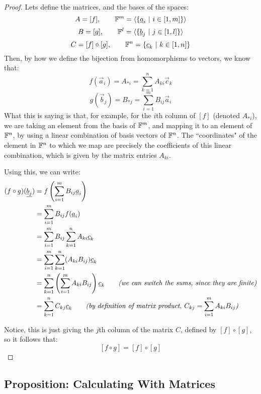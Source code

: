 \documentclass{exam}
\begin{document}
\begin{proof}

Lets define the matrices, and the bases of the spaces:
\[
A = [f], \qquad \F^m = \langle \{\vec{a}_i \ | \ i \in [1,m]\}\rangle
\]
\[
B = [g], \qquad \F^l = \langle \{\vec{b}_j \ | \ j \in [1,l]\}\rangle
\]
\[
C = [f]\circ[g], \qquad \F^n = \{\vec{c}_k \ | \ k \in [1,n]\}
\]
Then, by how we define the bijection from homomorphisms to vectors, we know that:
\[
f(\vec{a}_i) = A_{*i} = \sum_{k = 1}^n A_{ki}\vec{c}_k  
\]
\[
g(\vec{b}_j) = B_{*j} = \sum_{i = 1}^m B_{ij}\vec{a}_i  
\]
What this is saying is that, for example, for the $i$th column of $[f]$ (denoted $A_{*i}$), we are taking an element from the basis of $\F^m$, and mapping it to an element of $\F^n$, by using a linear combination of basis vectors of $\F^n$. The ``coordinates" of the element in $\F^n$ to which we map are precisely the coefficients of this linear combination, which is given by the matrix entries $A_{ki}$. 

\bigskip

Using this, we can write:
\begin{align*}
    (f \circ g)(\vec{\vec{b}_j}) &= f\left(\sum_{i = 1}^m B_{ij}\vec{a}_i  \right) \\
    &= \sum_{i = 1}^m B_{ij}f(\vec{a}_i) \\
    &= \sum_{i = 1}^m B_{ij}\sum_{k = 1}^n A_{ki}\vec{c}_k   \\
    &= \sum_{i = 1}^m \sum_{k = 1}^n (A_{ki}B_{ij})\vec{c}_k   \\
    &=  \sum_{k = 1}^n \left(\sum_{i = 1}^mA_{ki}B_{ij}\right)\vec{c}_k   \qquad \text{\textit{(we can switch the sums, since they are finite)}}\\
    &= \sum_{k = 1}^n C_{kj}\vec{c}_k \qquad \text{\textit{(by definition of matrix product, $C_{kj} = \sum_{i = 1}^mA_{ki}B_{ij}$)}} \\
\end{align*}

Notice, this is just giving the $j$th column of the matrix $C$, defined by $[f] \circ [g]$, so it follows that:
\[
[f \circ g] = [f] \circ [g]
\]

\end{proof}

\subsection{Proposition: Calculating With Matrices}
\end{document}
